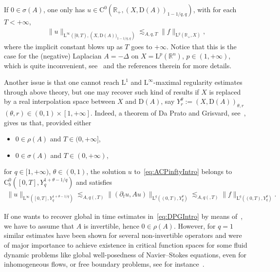 \documentclass[AHL,Unicode,longabstracts,published]{cedram}
\newcommand{\bbR}{\mathbb{R}}
\newcommand{\rmD}{\mathrm{D}}
\newcommand{\rmL}{\mathrm{L}}
\newcommand{\rmC}{\mathrm{C}}
\begin{document}
If $0\in\sigma(A)$, one only has $u\in \rmC^0(\bbR_+,(X,\rmD(A))_{1-1/q,q})$, with for each $T<+\infty$,
\begin{align}\label{eq:traceEstnoninvertible}
\| u \|_{\rmL^{\infty}([0,T),\left(X,\rmD(A))_{1-1/q,q}\right)} \lesssim_{A,q,T} \| f\|_{\rmL^q(\bbR_+,X)},
\end{align}
where the implicit constant blows up as $T$ goes to $+\infty$. Notice that this is the case for the (negative) Laplacian $A=-\Delta$ on $X=\rmL^p(\bbR^n)$, $p\in(1,+\infty)$, which is quite inconvenient, see~\cite[Section~1]{Gaudin2023} and the references therein for more details.

Another issue is that one cannot reach $\rmL^1$ and $\rmL^\infty$-maximal regularity estimates through above theory, but one may recover such kind of results if $X$ is replaced by a real interpolation space between $X$ and $\rmD(A)$, say $Y_{r}^{\theta}:=(X,\rmD(A))_{\theta,r}$ $(\theta,r)\in(0,1)\times[1,+\infty]$. Indeed, a theorem of Da Prato and Grisvard, see~\cite[Theorem~4.15]{DaPratoGrisvard1975}, gives us that, provided either
\begin{itemize}
\item $0\in\rho(A)$ and $T\in(0,+\infty]$,
\item $0\in\sigma(A)$ and $T\in(0,+\infty)$,
\end{itemize}
for $q\in[1,+\infty)$, $\theta\in(0,1)$, the solution $u$ to~\eqref{eq:ACPinftyIntro} belongs to $\rmC ^{0}_b([0,T],Y_{q}^{1+\theta-1/q})$ and satisfies
\begin{align}\label{eq:DPGIntro}
\| u\|_{\rmL^\infty\left([0,T],Y_{q}^{1+\theta-1/q}\right)} \lesssim_{A,q(,T)} \| (\partial_t u, Au)\|_{\rmL^q\left((0,T),Y_{q}^{\theta}\right)} \lesssim_{A,q(,T)} \| f\|_{\rmL^q\left((0,T),Y_{q}^{\theta}\right)}.
\end{align}

If one wants to recover global in time estimates in~\eqref{eq:DPGIntro} by means of~\cite[Theorem~4.15]{DaPratoGrisvard1975}, we have to assume that $A$ is invertible, hence $0\in\rho(A)$. However, for $q=1$ similar estimates have been shown for several non-invertible operators and were of major importance to achieve existence in critical function spaces for some fluid dynamic problems like global well-posedness of Navier--Stokes equations, even for inhomogeneous flows, or free boundary problems, see for instance~\cite{Chemin1999,DanchinMucha2009,DanchinMucha2015,OgawaShimizu2016,OgawaShimizu2021,OgawaShimizu2022}.
\end{document}
